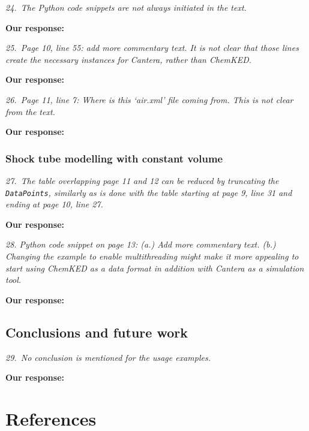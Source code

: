 \documentclass[a4paper,10pt]{elsarticle}
\begin{document}
\textit{24.~The Python code snippets are not always initiated in the text.}

\textbf{Our response:}


\textit{25.~Page 10, line 55: add more commentary text. It is not clear that those lines create the
necessary instances for Cantera, rather than ChemKED.}

\textbf{Our response:}


\textit{26.~Page 11, line 7: Where is this `air.xml' file coming from. This is not clear from the text.}

\textbf{Our response:}


\subsubsection*{Shock tube modelling with constant volume}

\textit{27.~The table overlapping page 11 and 12 can be reduced by truncating the \texttt{DataPoints}, similarly as is done with the table starting at page 9, line 31 and ending at page 10, line 27.}

\textbf{Our response:}

\textit{28. Python code snippet on page 13: (a.) Add more commentary text. (b.) Changing the example to enable multithreading might make it more appealing to start using ChemKED as a data format in addition with Cantera as a simulation tool.}

\textbf{Our response:}


\subsection*{Conclusions and future work}

\textit{29.~No conclusion is mentioned for the usage examples.}

\textbf{Our response:}

\section*{References}


\end{document}
